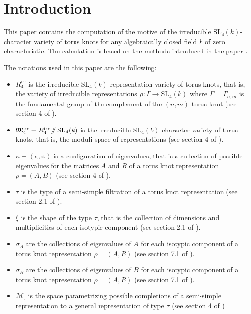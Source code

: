 \documentclass[10pt,a4paper]{amsart}
\begin{document}
\section*{Introduction}

\vspace{-0.05cm}

This paper contains the computation of the motive of the irreducible $\mathrm{SL}_{4}(k)$-character variety of torus knots for any algebraically closed field $k$ of zero characteristic. The calculation is based on the methods introduced in the paper \cite{GPM}. 

The notations used in this paper are the following:
\begin{itemize}
	\item $R_{4}^{\textrm{irr}}$ is the irreducible $\mathrm{SL}_{4}(k)$-representation variety of torus knots, that is, the variety of irreducible representations $\rho: \Gamma \to \mathrm{SL}_{4}(k)$ where $\Gamma = \Gamma_{n,m}$ is the fundamental group of the complement of the $(n,m)$-torus knot (see section {4} of \cite{GPM}).
	\item ${\frak M}_{4}^{\textrm{irr}} = R_{4}^{\textrm{irr}} \sslash \mathrm{SL}_{4}(k)$ is the irreducible $\mathrm{SL}_{4}(k)$-character variety of torus knots, that is, the moduli space of representations (see section {4} of \cite{GPM}).
	\item $\kappa = (\bm{\epsilon}, \bm{\varepsilon})$ is a configuration of eigenvalues, that is a collection of possible eigenvalues for the matrices $A$ and $B$ of a torus knot representation $\rho = (A,B)$ (see section {4} of \cite{GPM}).
	\item $\tau$ is the type of a semi-simple filtration of a torus knot representation (see section 2.1 of \cite{GPM}).
	\item $\xi$ is the shape of the type $\tau$, that is the collection of dimensions and multiplicities of each isotypic component (see section 2.1 of \cite{GPM}).
	\item $\sigma_A$ are the collections of eigenvalues of $A$ for each isotypic component of a torus knot representation $\rho = (A,B)$ (see section 7.1 of \cite{GPM}).
	\item $\sigma_B$ are the collections of eigenvalues of $B$ for each isotypic component of a torus knot representation $\rho = (A,B)$ (see section 7.1 of \cite{GPM}).
	\item $\mathcal{M}_{\tau}$ is the space parametrizing possible completions of a semi-simple representation to a general representation of type $\tau$ (see section 4 of \cite{GPM})

\end{itemize}
\end{document}

